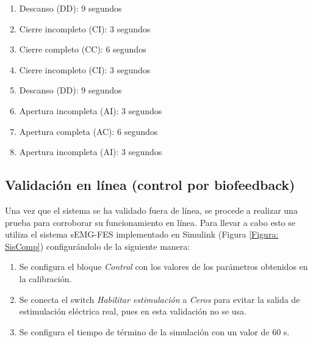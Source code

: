 \begin{enumerate}
	\item Descanso (DD): 9 segundos
	\item Cierre incompleto (CI): 3 segundos
	\item Cierre completo (CC): 6 segundos
	\item Cierre incompleto (CI): 3 segundos
	\item Descanso (DD): 9 segundos
	\item Apertura incompleta (AI): 3 segundos
	\item Apertura completa (AC): 6 segundos
	\item Apertura incompleta (AI): 3 segundos
\end{enumerate}


\subsection{Validación en línea (control por biofeedback)}

Una vez que el sistema se ha validado fuera de línea, se procede a realizar una prueba para corroborar su funcionamiento en línea. Para llevar a cabo esto se utiliza el sistema sEMG-FES implementado en Simulink\textregistered \; (Figura \ref{Figura: SisComp}) configurándolo de la siguiente manera:

\begin{enumerate}
	\item Se configura el bloque \emph{Control} con los valores de los parámetros obtenidos en la calibración.
	\item Se conecta el switch \emph{Habilitar estimulación} a \emph{Ceros} para evitar la salida de estimulación eléctrica real, pues en esta validación no se usa.
	\item Se configura el tiempo de término de la simulación con un valor de 60 s.
\end{enumerate}

